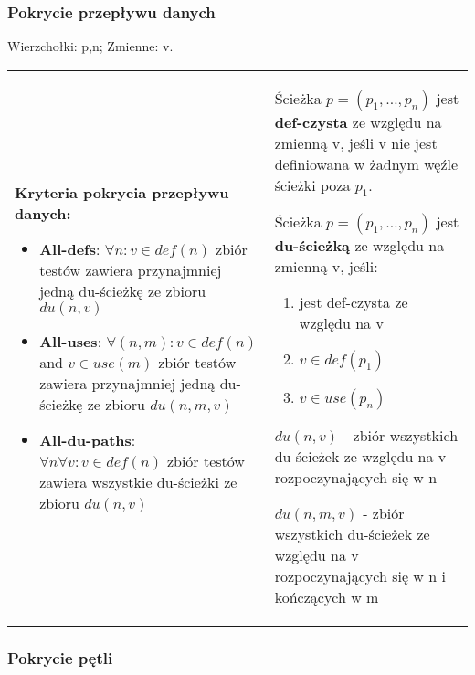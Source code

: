 \documentclass[../main.tex]{subfiles}
\begin{document}
    \subsubsection{Pokrycie przepływu danych}
    Wierzchołki: p,n; Zmienne: v.
    \begin{table}[H]
        \begin{center}
            \begin{tabular}{p{8cm} p{8cm}}
                \textbf{Kryteria pokrycia przepływu danych:}
                \begin{itemize}
                    \item \textbf{All-defs}: $\forall n : v \in def(n)$
                    zbiór testów zawiera przynajmniej jedną du-ścieżkę ze zbioru $du(n, v)$
                    \item \textbf{All-uses}: $\forall (n, m) : v \in def(n)$ and $v \in use(m)$ zbiór testów zawiera przynajmniej jedną
                    du-ścieżkę ze zbioru $du(n, m, v)$
                    \item \textbf{All-du-paths}: $\forall n \forall v: v \in def(n)$
                    zbiór testów zawiera wszystkie du-ścieżki ze zbioru $du(n, v)$
                \end{itemize}
                &
                Ścieżka $p = (p_1 , \dots, p_n)$ jest \textbf{def-czysta} ze względu na zmienną v, jeśli v nie jest
                definiowana w żadnym węźle ścieżki poza $p_1$.

                Ścieżka $p = (p_1 , \dots, p_n)$ jest \textbf{du-ścieżką} ze względu na zmienną v, jeśli:
                \begin{enumerate}
                    \item jest def-czysta ze względu na v
                    \item $v \in def(p_1)$
                    \item $v \in use(p_n)$
                \end{enumerate}

                $du(n, v)$ - zbiór wszystkich du-ścieżek ze względu na v rozpoczynających się w n

                $du(n, m, v)$ - zbiór wszystkich du-ścieżek ze względu na v rozpoczynających się w n i kończących w m
            \end{tabular}
        \end{center}
    \end{table}

    \subsubsection{Pokrycie pętli}
\end{document}

